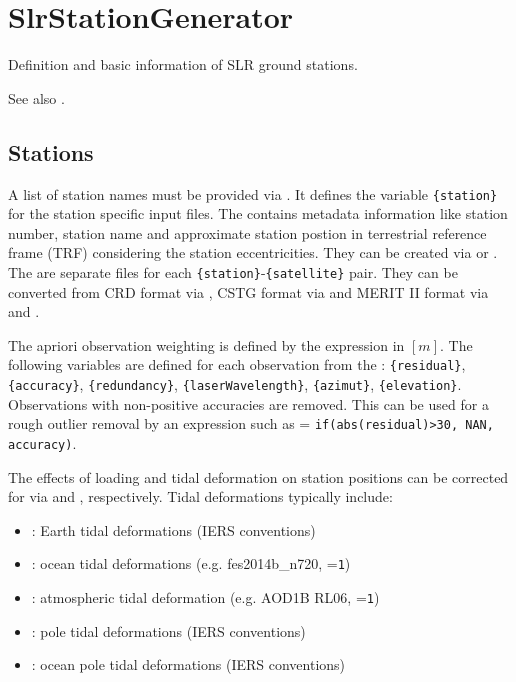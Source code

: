 \clearpage

\section{SlrStationGenerator}\label{slrStationGeneratorType}
Definition and basic information of SLR ground stations.

See also .


\subsection{Stations}\label{slrStationGeneratorType:stations}
A list of station names must be provided via .
It defines the variable \verb|{station}| for the station specific input files.
The  contains metadata information like station number,
station name and approximate station postion in terrestrial reference frame (TRF)
considering the station eccentricities. They can be created via 
or . The  are separate files
for each \verb|{station}|-\verb|{satellite}| pair. They can be converted from CRD
format via , CSTG format via 
and MERIT II format via  and .

The apriori observation weighting is defined by the expression  in $[m]$.
The following variables are defined for each observation from the
: \verb|{residual}|, \verb|{accuracy}|,
\verb|{redundancy}|, \verb|{laserWavelength}|, \verb|{azimut}|, \verb|{elevation}|.
Observations with non-positive accuracies are removed.
This can be used for a rough outlier removal by an expression such as
 = \verb|if(abs(residual)>30, NAN, accuracy)|.

The effects of loading and tidal deformation on station positions can be corrected for
via  and
, respectively.
Tidal deformations typically include:
\begin{itemize}
  \item {}: Earth tidal deformations (IERS conventions)
  \item {}: ocean tidal deformations
        (e.g. fes2014b\_n720, =\verb|1|)
  \item {}: atmospheric tidal deformation
        (e.g. AOD1B RL06, =\verb|1|)
  \item {}: pole tidal deformations (IERS conventions)
  \item {}: ocean pole tidal deformations (IERS conventions)
\end{itemize}


